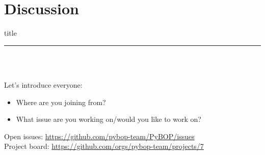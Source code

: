\documentclass[aspectratio=169]{beamer}
\begin{document}
\section{Discussion}

\begin{frame}[plain]
    \centering
    \begin{beamercolorbox}[sep=8pt,center,shadow=true,rounded=true]{title}
    \par%
    \color{oxfordblue}\noindent\rule{10cm}{1pt} \\
    \LARGE{\faUserPlus} \LARGE{\faBug} \\
    \normalsize
    \begin{flushleft}
        Let's introduce everyone:
    \end{flushleft}
    \begin{itemize}
        \item Where are you joining from?
        \item What issue are you working on/would you like to work on?
    \end{itemize}
    \vspace{6mm} \normalsize
    Open issues: \href{https://github.com/pybop-team/PyBOP/issues}{https://github.com/pybop-team/PyBOP/issues} \\
    Project board: \href{https://github.com/orgs/pybop-team/projects/7}{https://github.com/orgs/pybop-team/projects/7}
    \end{beamercolorbox}
\end{frame}


\end{document}
